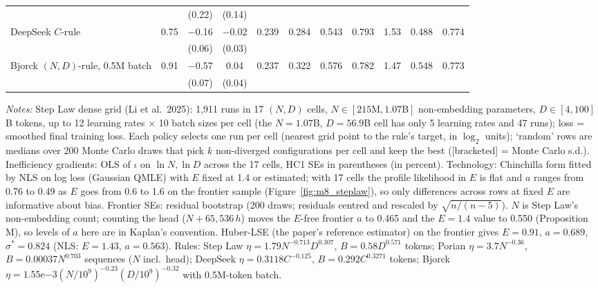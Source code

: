 \begin{table}[htbp]
\begin{threeparttable}
\begin{tabular}{lcccccccccc}
 & & (0.22) & (0.14) & & & & & & &  \\
DeepSeek $C$-rule & 0.75 & $-$0.16 & $-$0.02 & 0.239 & 0.284 & 0.543 & 0.793 & 1.53 & 0.488 & 0.774 \\
 & & (0.06) & (0.03) & & & & & & &  \\
Bjorck $(N,D)$-rule, 0.5M batch & 0.91 & $-$0.57 & 0.04 & 0.237 & 0.322 & 0.576 & 0.782 & 1.47 & 0.548 & 0.773 \\
 & & (0.07) & (0.04) & & & & & & &  \\
\bottomrule
\end{tabular}
\begin{tablenotes}[flushleft]
\footnotesize
\item \textit{Notes:} Step Law dense grid (Li et al.\ 2025): 1,911 runs in 17 $(N,D)$ cells, $N\in[215\mathrm{M},1.07\mathrm{B}]$ non-embedding parameters, $D\in[4,100]$B tokens, up to 12 learning rates $\times$ 10 batch sizes per cell (the $N=1.07$B, $D=56.9$B cell has only 5 learning rates and 47 runs); loss = smoothed final training loss. Each policy selects one run per cell (nearest grid point to the rule's target, in $\log_2$ units); `random' rows are medians over 200 Monte Carlo draws that pick $k$ non-diverged configurations per cell and keep the best ([bracketed] = Monte Carlo s.d.). Inefficiency gradients: OLS of $\iota$ on $\ln N,\ln D$ across the 17 cells, HC1 SEs in parentheses (in percent). Technology: Chinchilla form fitted by NLS on log loss (Gaussian QMLE) with $E$ fixed at 1.4 or estimated; with 17 cells the profile likelihood in $E$ is flat and $a$ ranges from 0.76 to 0.49 as $E$ goes from 0.6 to 1.6 on the frontier sample (Figure~\ref{fig:m8_steplaw}), so only differences across rows at fixed $E$ are informative about bias. Frontier SEs: residual bootstrap (200 draws; residuals centred and rescaled by $\sqrt{n/(n-5)}$). $N$ is Step Law's non-embedding count; counting the head ($N+65{,}536\,h$) moves the $E$-free frontier $a$ to 0.465 and the $E=1.4$ value to 0.550 (Proposition M), so levels of $a$ here are in Kaplan's convention. Huber-LSE (the paper's reference estimator) on the frontier gives $E=0.91$, $a=0.689$, $\sigma^*=0.824$ (NLS: $E=1.43$, $a=0.563$). Rules: Step Law $\eta=1.79N^{-0.713}D^{0.307}$, $B=0.58D^{0.571}$ tokens; Porian $\eta=3.7N^{-0.36}$, $B=0.00037N^{0.703}$ sequences ($N$ incl.\ head); DeepSeek $\eta=0.3118C^{-0.125}$, $B=0.292C^{0.3271}$ tokens; Bjorck $\eta=1.55\mathrm{e}{-3}(N/10^9)^{-0.23}(D/10^9)^{-0.32}$ with 0.5M-token batch.
\end{tablenotes}
\end{threeparttable}
\end{table}
